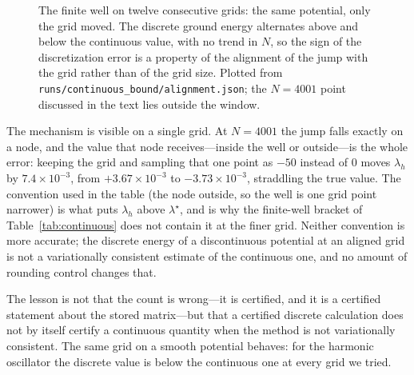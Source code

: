 \begin{figure}[t]
\centering
{}
\caption{The finite well on twelve consecutive grids: the same potential,
only the grid moved. The discrete ground energy alternates above and below
the continuous value, with no trend in $N$, so the sign of the
discretization error is a property of the alignment of the jump with the
grid rather than of the grid size. Plotted from
\texttt{runs/continuous\_bound/alignment.json}; the $N=4001$ point discussed
in the text lies outside the window.}
\label{fig:alignment}
\end{figure}

The mechanism is visible on a single grid. At $N=4001$ the jump falls exactly
on a node, and the value that node receives---inside the well or outside---is
the whole error: keeping the grid and sampling that one point as $-50$ instead
of $0$ moves $\lambda_h$ by $7.4\times10^{-3}$, from $+3.67\times10^{-3}$ to
$-3.73\times10^{-3}$, straddling the true value. The convention used in the
table (the node outside, so the well is one grid point narrower) is what puts
$\lambda_h$ above $\lambda^\star$, and is why the finite-well bracket of
Table~\ref{tab:continuous} does not contain it at the finer grid. Neither
convention is more accurate; the discrete energy of a discontinuous potential
at an aligned grid is not a variationally consistent estimate of the
continuous one, and no amount of rounding control changes that.

The lesson is not that the count is wrong---it is certified, and it is a
certified statement about the stored matrix---but that a certified discrete
calculation does not by itself certify a continuous quantity when the method
is not variationally consistent. The same grid on a smooth potential behaves:
for the harmonic oscillator the discrete value is below the continuous one at
every grid we tried.

